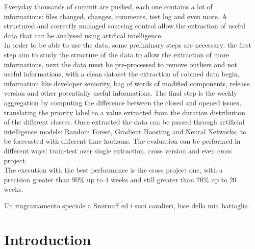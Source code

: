 \documentclass[%
    corpo=12pt,
    twoside,
    oldstyle,
    autoretitolo,
    greek,
    evenboxes,
]{toptesi}
\begin{document}
\frontespizio
\summary
Everyday thousands of commit are pushed, each one contains a lot of informations: files changed, changes, comments, test log and even more. A structured and correctly managed sourcing control allow the extraction of useful data that can be analysed using artifical intelligence.\\
In order to be able to use the data, some preliminary steps are necessary: the first step aim to study the structure of the data to allow the extraction of more informations, next the data must be pre-processed to remove outliers and not useful informations, with a clean dataset the extraction of cobined data begin, information like developer seniority, bag of words of modified components, release version and other potentially useful informations. The final step is the weekly aggregation by computing the difference between the closed and opened issues, translating the priority label to a value extracted from the duration distribution of the different classes. Once extracted the data can be passed through artificial intelligence models: Random Forest, Gradient Boosting and Neural Networks, to be forecasted with different time horizons. The evaluation can be performed in different ways: train-test over single extraction, cross version and even cross project.\\
The execution with the best performance is the cross project one, with a precision greater than 90\% up to 4 weeks and still greater than 70\% up to 20 weeks.


\acknowledgements

Un ringraziamento speciale a Smirnuff ed i suoi cavalieri, luce della mia battaglia.

\indici

\mainmatter


\chapter{Introduction}
\label{chap:intro}
\end{document}
